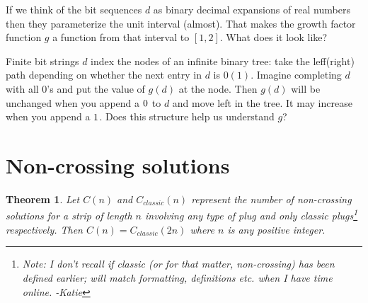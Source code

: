 \documentclass[10pt]{article}
\newtheorem{theorem}{Theorem}
\numberwithin{equation}{section}
\newcommand{\plug}[1]{%
\mbox{{\textbf\texttt #1}}
}
\begin{document}
 If we think of the bit sequences $d$ as binary decimal expansions of
 real numbers then they parameterize the unit interval (almost). That
 makes the growth factor function $g$ a function from that interval to
 $[1,2]$. What does it look like? 
 
 Finite bit strings $d$ index the nodes of an infinite binary tree:
 take the leff(right) path depending on whether the next entry in $d$
 is $0(1)$. Imagine completing $d$ with all $0$'s and put the value of
 $g(d)$ at the node. Then $g(d)$ will be unchanged when you append a
 $\plug{0}$ to $d$ and move left in the tree. It may increase when you
 append a $\plug{1}$. Does this structure  help us understand $g$? 


\section{Non-crossing solutions}

\begin{theorem}
Let $C(n)$ and $C_{classic}(n)$ represent the number of non-crossing solutions for a strip of length $n$ involving any type of plug and only classic plugs\footnote{Note: I don't recall if classic (or for that matter, non-crossing) has been defined earlier; will match formatting, definitions etc. when I have time online. -Katie} respectively.  Then $C(n) = C_{classic}(2n)$ where $n$ is any positive integer.
\end{theorem}
\end{document}
